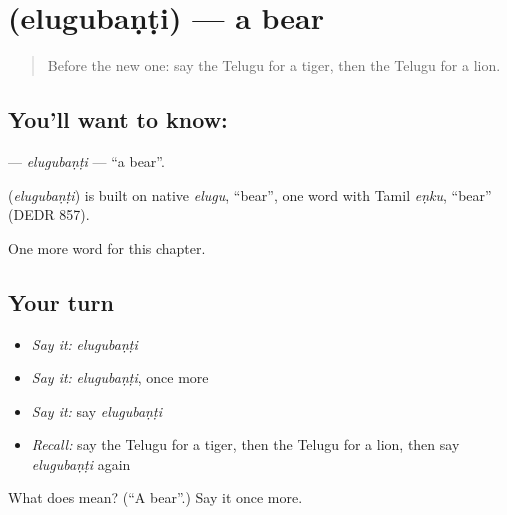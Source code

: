 \section[\texorpdfstring{\te{ఎలుగుబంటి} (elugubaṇṭi)}{ఎలుగుబంటి (elugubaṇṭi)}]{ (elugubaṇṭi) — a bear}

\label{lesson:TE-C123-elugubanti}



\begin{quote}
Before the new one: say the Telugu for a tiger, then the Telugu for a lion.
\end{quote}

\subsection*{You'll want to know: }
\textbf{} — \emph{elugubaṇṭi} — \textquotedblleft{}a bear\textquotedblright{}.

\begin{cousinweb}
\textbf{} (\emph{elugubaṇṭi}) is built on native \emph{elugu}, \textquotedblleft{}bear\textquotedblright{}, one word with Tamil \emph{eṇku}, \textquotedblleft{}bear\textquotedblright{} (DEDR 857).
\end{cousinweb}

\begin{grammarlens}[title={What you've built}]
One more word for this chapter.
\end{grammarlens}

\subsection*{Your turn}
\begin{itemize}
\raggedright
  \item \emph{Say it:} \emph{elugubaṇṭi}
  \item \emph{Say it:} \emph{elugubaṇṭi}, once more
  \item \emph{Say it:} say \emph{elugubaṇṭi}
  \item \emph{Recall:} say the Telugu for a tiger, then the Telugu for a lion, then say \emph{elugubaṇṭi} again
\end{itemize}

\begin{tcolorbox}[breakable,colback=teal!4,colframe=teal!35!black,title={Before you move on}]
What does  mean? (\textquotedblleft{}A bear\textquotedblright{}.) Say it once more.
\end{tcolorbox}
